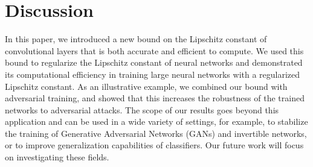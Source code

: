 \section{Discussion}
\label{section:ch5-dicussion}


In this paper, we introduced a new bound on the Lipschitz constant of convolutional layers that is both accurate and efficient to compute.
We used this bound to regularize the Lipschitz constant of neural networks and demonstrated its computational efficiency in training large neural networks with a regularized Lipschitz constant.
As an illustrative example, we combined our bound with adversarial training, and showed that this increases the robustness of the trained networks to  adversarial attacks.
The scope of our results goes beyond this application and can be used in a wide variety of settings, for example, to stabilize the training of Generative Adversarial Networks (GANs) and invertible networks, or to improve generalization capabilities of classifiers.
Our future work will focus on investigating these fields.

